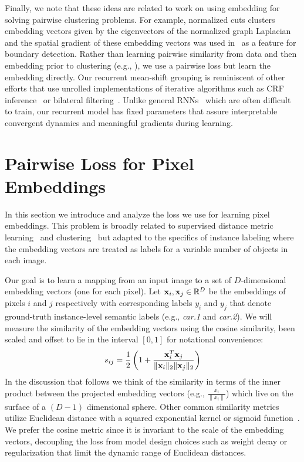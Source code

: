 \documentclass[10pt,twocolumn,letterpaper]{article}
\def\x{{\bf x}}
\begin{document}
Finally, we note that these ideas are related to work on using embedding for
solving pairwise clustering problems. For example, normalized cuts clusters
embedding vectors given by the eigenvectors of the normalized graph
Laplacian~\cite{shi2000normalized} and the spatial gradient of these embedding
vectors was used in~\cite{arbelaez2011contour} as a feature for boundary
detection. Rather than learning pairwise similarity from data and then
embedding prior to clustering (e.g., \cite{maire2016affinity}), we use a
pairwise loss but learn the embedding directly. Our recurrent mean-shift
grouping is reminiscent of other efforts that use unrolled implementations of
iterative algorithms such as CRF inference~\cite{zheng2015conditional} or
bilateral filtering~\cite{jampani2016learning, gadde2015superpixel}. Unlike
general RNNs~\cite{bengio1994learning, pascanu2013difficulty} which are often
difficult to train, our recurrent model has fixed parameters that assure
interpretable convergent dynamics and meaningful gradients during learning.

\section{Pairwise Loss for Pixel Embeddings}\label{sec:max-margin}
In this section we introduce and analyze the loss we use for learning pixel
embeddings. This problem is broadly related to supervised distance metric
learning~\cite{weinberger2009distance,kong2012dictionary, kong2013learning} and clustering~\cite{kong2012multi}
but adapted to the specifics of instance labeling where
the embedding vectors are treated as labels for a variable number of objects in
each image.

Our goal is to learn a mapping from an input image to a set of $D$-dimensional
embedding vectors (one for each pixel).  Let $\x_i,\x_j \in {\mathbb R}^D$ be the
embeddings of pixels $i$ and $j$ respectively with corresponding labels $y_i$
and $y_j$ that denote ground-truth instance-level semantic labels (e.g., {\em
car.1} and {\em car.2}). We will measure the similarity of the embedding vectors
using the cosine similarity, been scaled and offset to lie in the interval
$[0,1]$ for notational convenience:
\begin{equation}
\begin{split} \small
s_{ij} = \frac{1}{2}\left(1 + \frac{\x_i^T\x_j}{\Vert\x_i\Vert_2 \Vert\x_j\Vert_2}\right)
\end{split}
\label{eq:calibrated_cosine_similarity}
\end{equation}
In the discussion that follows we think of the similarity in terms of the inner
product between the projected embedding vectors (e.g., $\frac{x_i}{\|x_i\|}$)
which live on the surface of a $(D-1)$ dimensional sphere.  Other common
similarity metrics utilize Euclidean distance with a squared exponential kernel
or sigmoid function~\cite{newell2016associative, fathi2017semantic}. We prefer
the cosine metric since it is invariant to the scale of the embedding vectors,
decoupling the loss from model design choices such as weight decay or
regularization that limit the dynamic range of Euclidean distances.
\end{document}
